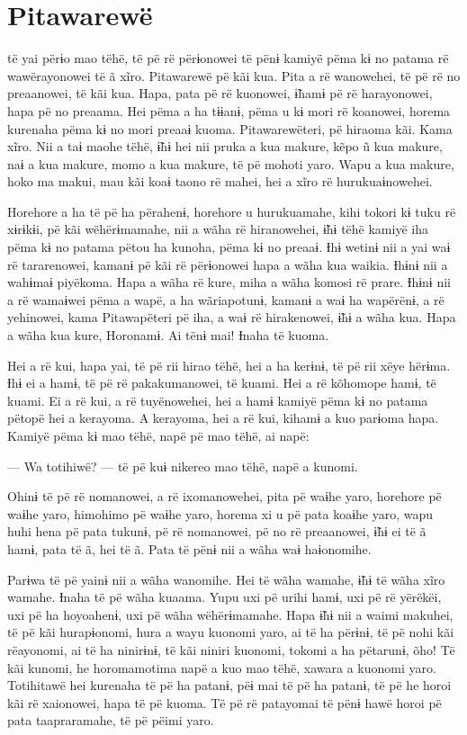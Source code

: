 \chapter{Pitawarewë}

 të yai përɨo mao tëhë, të pë rë përɨonowei të pënɨ kamiyë pëma
kɨ no patama rë wawërayonowei të ã xĩro. Pitawarewë pë kãi kua. Pita a
rë wanowehei, të pë rë no preaanowei, të kãi kua. Hapa, pata pë rë
kuonowei, ɨ̃hamɨ pë rë harayonowei, hapa pë no preaama. Hei pëma a ha
tɨɨanɨ, pëma u kɨ mori rë koanowei, horema kurenaha pëma kɨ no mori
preaaɨ kuoma. Pitawarewëteri, pë hiraoma kãi. Kama xĩro. Nii a taɨ maohe
tëhë, ɨ̃hɨ hei nii pruka a kua makure, kẽpo ũ kua makure, naɨ a kua
makure, momo a kua makure, të pë mohoti yaro. Wapu a kua makure, hoko ma
makui, mau kãi koaɨ taono rë mahei, hei a xĩro rë hurukuaɨnowehei. 

Horehore a ha të pë ha përahenɨ, horehore u hurukuamahe, kihi tokori kɨ
tuku rë xɨrɨkɨi, pë kãi wëhërɨmamahe, nii a wãha rë hiranowehei, ɨ̃hɨ
tëhë kamiyë iha pëma kɨ no patama pëtou ha kunoha, pëma kɨ no preaaɨ.
Ɨhɨ wetinɨ nii a yai waɨ rë tararenowei, kamanɨ pë kãi rë përɨonowei
hapa a wãha kua waikia. Ɨhɨnɨ nii a wahɨmaɨ piyëkoma. Hapa a wãha rë
kure, miha a wãha komosi rë prare. Ɨhɨnɨ nii a rë wamaɨwei pëma a wapë,
a ha wãriapotunɨ, kamanɨ a waɨ ha wapërënɨ, a rë yehinowei, kama
Pitawapëteri pë iha, a waɨ rë hirakenowei, ɨ̃hɨ a wãha kua. Hapa a wãha
kua kure, Horonamɨ. Ai tënɨ mai! Ɨnaha të kuoma. 

Hei a rë kui, hapa yai, të pë rii hirao tëhë, hei a ha kerɨnɨ, të pë rii
xëye hërɨma. Ɨhɨ ei a hamɨ, të pë rë pakakumanowei, të kuami. Hei a rë
kõhomope hamɨ, të kuami. Ei a rë kui, a rë tuyënowehei, hei a hamɨ
kamiyë pëma kɨ no patama pëtopë hei a kerayoma. A kerayoma, hei a rë
kui, kihamɨ a kuo parɨoma hapa. Kamiyë pëma kɨ mao tëhë, napë pë mao
tëhë, ai napë:

--- Wa totihiwë? --- të pë kuɨ nikereo mao tëhë, napë a kunomi.

Ohinɨ të pë rë nomanowei, a rë ixomanowehei, pita pë waɨhe yaro,
horehore pë waɨhe yaro, himohimo pë waɨhe yaro, horema xi u pë pata
koaɨhe yaro, wapu huhi hena pë pata tukunɨ, pë rë nomanowei, pë no rë
preaanowei, ɨ̃hɨ ei të ã hamɨ, pata të ã, hei të ã. Pata të pënɨ nii a
wãha waɨ haɨonomihe. 

Parɨwa të pë yainɨ nii a wãha wanomihe. Hei të wãha wamahe, ɨ̃hɨ të wãha
xĩro wamahe. Ɨnaha të pë wãha kuaama. Yupu uxi pë urihi hamɨ, uxi pë rë
yërëkëi, uxi pë ha hoyoahenɨ, uxi pë wãha wëhërɨmamahe. Hapa ɨ̃hɨ nii a
waimi makuhei, të pë kãi hurapɨonomi, hura a wayu kuonomi yaro, ai të ha
përɨnɨ, të pë nohi kãi rëayonomi, ai të ha ninirɨnɨ, të kãi niniri
kuonomi, tokomi a ha pëtarunɨ, õho! Të kãi kunomi, he horomamotima napë
a kuo mao tëhë, xawara a kuonomi yaro. Totihitawë hei kurenaha të pë ha
patanɨ, pëɨ mai të pë ha patanɨ, të pë he horoi kãi rë xaionowei, hapa
të pë kuoma. Të pë rë patayomai të pënɨ hawë horoi pë pata taapraramahe,
të pë pëimi yaro. 

